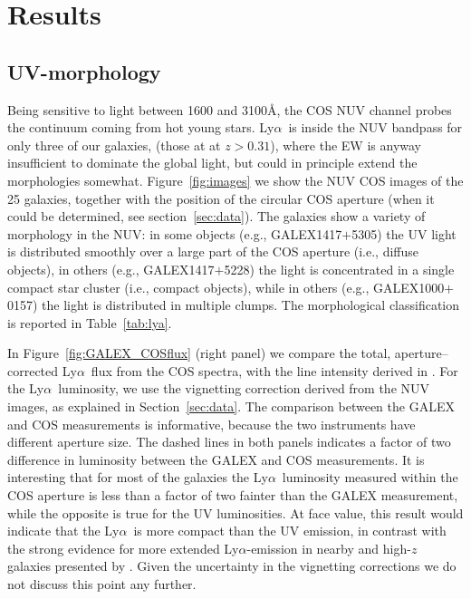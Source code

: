 \documentclass[manuscript]{emulateapj}
\newcommand{\lya}{Ly$\alpha$}
\begin{document}
\section{Results}

\subsection{UV-morphology}
Being sensitive to light between 1600 and 3100\AA, the COS NUV channel
probes the continuum coming from hot young stars.  \lya\ is inside the
NUV bandpass for only three of our galaxies, (those at at $z>0.31$),
where the EW is anyway insufficient to dominate the global light, but
could in principle extend the morphologies somewhat.
Figure~\ref{fig:images} we show the NUV COS images of the 25 galaxies,
together with the position of the circular COS aperture (when it could
be determined, see section~\ref{sec:data}). The galaxies show a
variety of morphology in the NUV: in some objects (e.g.,
GALEX1417$+$5305) the UV light is distributed smoothly over a large
part of the COS aperture (i.e., diffuse objects), in others (e.g.,
GALEX1417$+$5228) the light is concentrated in a single compact star
cluster (i.e., compact objects), while in others (e.g.,
GALEX1000$+$0157) the light is distributed in multiple clumps.  The
morphological classification is reported in Table~\ref{tab:lya}.

In Figure~\ref{fig:GALEX_COSflux} (right panel) we compare the
total, aperture--corrected \lya\ flux from the COS spectra, with the
line intensity derived in \citet{cowie2011}. For the \lya\ luminosity,
we use the vignetting correction derived from the NUV images, as
explained in Section~\ref{sec:data}. The comparison between the GALEX
and COS measurements is informative, because the two instruments have
different aperture size. The dashed lines in both panels indicates a
factor of two difference in luminosity between the GALEX and COS
measurements. It is interesting that for most of the galaxies the
\lya\ luminosity measured within the COS aperture is less than a
factor of two fainter than the GALEX measurement, while the opposite
is true for the UV luminosities. At face value, this result would
indicate that the \lya\ is more compact than the UV emission, in
contrast with the strong evidence for more extended \lya-emission in
nearby and high-$z$ galaxies presented by \citet[e.g., ]{hayes2013,
  steidelXXX, hayesXXX}. Given the uncertainty in the vignetting
corrections we do not discuss this point any further.
\end{document}

